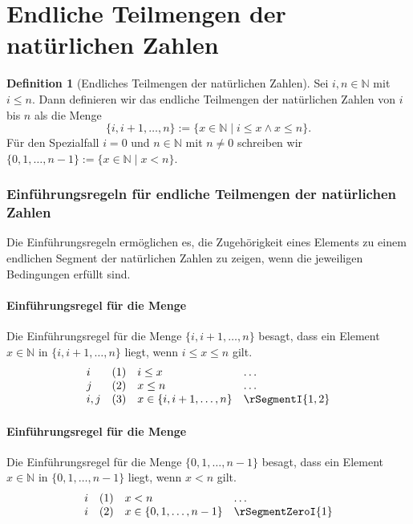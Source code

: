 \documentclass{book}
\theoremstyle{plain}
\theoremstyle{remark}
\theoremstyle{definition}
\newtheorem{definition}{Definition}[section]
\begin{document}
\section{Endliche Teilmengen der natürlichen Zahlen}

\begin{definition}[Endliches Teilmengen der natürlichen Zahlen]
    Sei \(i, n \in \mathbb{N}\) mit \(i \leq n\). Dann definieren wir das endliche Teilmengen der natürlichen Zahlen von \(i\) bis \(n\) als die Menge
    \[
    \{i, i+1, \dots, n\} := \{ x \in \mathbb{N} \mid i \leq x \land x \leq n \}.
    \]
    Für den Spezialfall \(i = 0\) und \(n\in\mathbb{N}\) mit \(n \neq 0\) schreiben wir \(\{0, 1, \dots, n-1\} := \{ x \in \mathbb{N} \mid x < n \}\).
\end{definition}

\subsubsection{Einführungsregeln für endliche Teilmengen der natürlichen Zahlen}

Die Einführungsregeln ermöglichen es, die Zugehörigkeit eines Elements zu einem endlichen Segment der natürlichen Zahlen zu zeigen, wenn die jeweiligen Bedingungen erfüllt sind.

\paragraph{Einführungsregel für die Menge}
\label{rule:rSegmentI}
Die Einführungsregel für die Menge \(\{i, i+1, \dots, n\}\) besagt, dass ein Element \(x \in \mathbb{N}\) in \(\{i, i+1, \dots, n\}\) liegt, wenn \(i \leq x \leq n\) gilt.
\[
\begin{array}{llll}
    i   & (1) & i \leq x & \dots \\
    j   & (2) & x \leq n & \dots \\
    i,j & (3) & x \in \{i, i+1, \dots, n\} & \rSegmentI{1,2}
\end{array}
\]

\paragraph{Einführungsregel für die Menge}
\label{rule:rSegmentZeroI}
Die Einführungsregel für die Menge \(\{0, 1, \dots, n-1\}\) besagt, dass ein Element \(x \in \mathbb{N}\) in \(\{0, 1, \dots, n-1\}\) liegt, wenn \(x < n\) gilt.
\[
\begin{array}{llll}
    i   & (1) & x < n & \dots \\
    i   & (2) & x \in \{0, 1, \dots, n-1\} & \rSegmentZeroI{1}
\end{array}
\]
\end{document}
